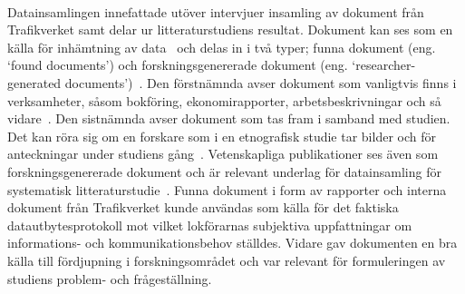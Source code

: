 \paragraph{}
\hspace{-11pt}Datainsamlingen innefattade utöver intervjuer insamling av dokument från Trafikverket samt delar ur litteraturstudiens resultat.
Dokument kan ses som en källa för inhämtning av data~\cite{Oates2005} och delas in i två typer; funna dokument (eng. \lq{}found documents\rq{}) och forskningsgenererade dokument (eng. \lq{}researcher-generated documents\rq{})~\cite{Oates2005}.
Den förstnämnda avser dokument som vanligtvis finns i verksamheter, såsom bokföring, ekonomirapporter, arbetsbeskrivningar och så vidare~\cite{Oates2005}.
Den sistnämnda avser dokument som tas fram i samband med studien.
Det kan röra sig om en forskare som i en etnografisk studie tar bilder och för anteckningar under studiens gång~\cite{Oates2005}.
Vetenskapliga publikationer ses även som forskningsgenererade dokument och är relevant underlag för datainsamling för systematisk litteraturstudie~\cite{Oates2005}.
Funna dokument i form av rapporter och interna dokument från Trafikverket kunde användas som källa för det faktiska datautbytesprotokoll mot vilket lokförarnas subjektiva uppfattningar om informations- och kommunikationsbehov ställdes.
Vidare gav dokumenten en bra källa till fördjupning i forskningsområdet och var relevant för formuleringen av studiens problem- och frågeställning.